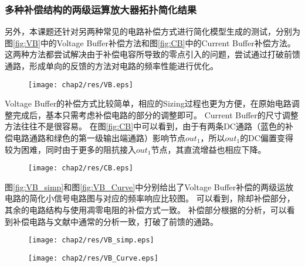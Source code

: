 \subsubsection{多种补偿结构的两级运算放大器拓扑简化结果}
\label{subsubsec:simp:res:cir:ts}

另外，本课题还针对另两种常见的电路补偿方式进行简化模型生成的测试，分别为图\ref{fig:VB}中的Voltage Buffer补偿方法和图\ref{fig:CB}中的Current Buffer补偿方法。
这两种方法都尝试解决由于补偿电容所导致的零点引入的问题，尝试通过打破前馈通路，形成单向的反馈的方法对电路的频率性能进行优化。

\begin{figure}[!htp]
	\centering
	\texttt{[image: chap2/res/VB.eps]}
\end{figure}

Voltage Buffer的补偿方式比较简单，相应的Sizing过程也更为方便，在原始电路调整完成后，基本只需考虑补偿电路的部分的调整即可。
Current Buffer的尺寸调整方法往往不是很容易。
在图\ref{fig:CB}中可以看到，由于有两条DC通路（蓝色的补偿电路通路和绿色的第一级输出端通路）影响节点$out_1$，所以$out_1$的DC偏置变得较为困难，同时由于更多的阻抗接入$out_1$节点，其直流增益也相应下降。

\begin{figure}[!htp]
	\centering
	\texttt{[image: chap2/res/CB.eps]}
\end{figure}

图\ref{fig:VB_simp}和图\ref{fig:VB_Curve}中分别给出了Voltage Buffer补偿的两级运放电路的简化小信号电路图与对应的频率响应比较图。
可以看到，除却补偿部分，其余的电路结构与使用凋零电阻的补偿方式一致。
补偿部分根据\parencite{VB1,VB2}的分析，可以看到补偿电路与文献中通常的分析一致，打破了前馈的通路。

\begin{figure}[!htp]
	\centering
	\texttt{[image: chap2/res/VB\_simp.eps]}
\end{figure}

\begin{figure}[!htp]
	\centering
	\texttt{[image: chap2/res/VB\_Curve.eps]}
\end{figure}

